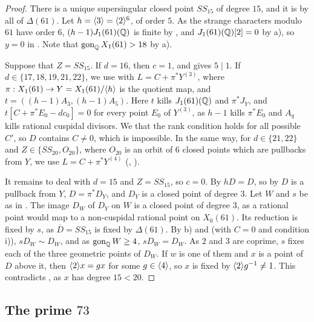 \begin{proof}
There is a unique supersingular closed point $SS_{15}$ of degree $15$, and it is  by all of $\Delta(61)$. Let $h=\langle 3\rangle=\langle 2\rangle^6$, of order $5$. As the strange characters modulo $61$ have order $6$, $(h-1)J_1(61)(\mathbb{Q})$ is finite by , and $J_1(61)(\mathbb{Q})[2]=0$ by  a), so $y=0$ in . Note that $\operatorname{gon}_{\mathbb{Q}} X_1(61)>18$ by  a).

Suppose that $Z=SS_{15}$. If $d=16$, then $c=1$, and  gives $5\mid 1$. If $d\in\{17,18,19,21,22\}$, we use  with $L=C+\pi^*Y^{(3)}$, where $\pi:X_1(61)\to Y=X_1(61)/\langle h\rangle$ is the quotient map, and $t=((h-1)A_3,(h-1)A_5)$. Here $t$ kills $J_1(61)(\mathbb{Q})$ and $\pi^*J_Y$, and $t[C+\pi^*E_0-dc_0]=0$ for every point $E_0$ of $Y^{(3)}$, as $h-1$ kills $\pi^*E_0$ and $A_q$ kills rational cuspidal divisors. We  that the rank condition holds for all possible $C'$, so $D$ contains $C\neq0$, which is impossible. In the same way, for $d\in\{21,22\}$ and $Z\in\{SS_{20},O_{20}\}$, where $O_{20}$ is an orbit of $6$ closed points which are pullbacks from $Y$, we use $L=C+\pi^*Y^{(4)}$ (, ).

It remains to deal with $d=15$ and $Z=SS_{15}$, so $c=0$. By  $hD=D$, so by  $D$ is a pullback from $Y$, $D=\pi^*D_Y$, and $D_Y$ is a closed point of degree $3$. Let $W$ and $s$ be as in . The image $D_W$ of $D_Y$ on $W$ is a closed point of degree $3$, as a rational point would map to a non-cuspidal rational point on $X_0(61)$. Its reduction is fixed by $s$, as $\overline D=SS_{15}$ is fixed by $\Delta(61)$. By  b) and  (with $C=0$ and condition i)), $sD_W\sim D_W$, and as $\operatorname{gon}_{\mathbb{Q}} W\geq 4$, $sD_W=D_W$. As $2$ and $3$ are coprime, $s$ fixes each of the three geometric points of $D_W$. If $w$ is one of them and $x$ is a point of $D$ above it, then $\langle 2\rangle x=gx$ for some $g\in\langle 4\rangle$, so $x$ is fixed by $\langle 2\rangle g^{-1}\neq1$. This contradicts , as $x$ has degree $15<20$.
\end{proof}

\subsection{The prime \texorpdfstring{$73$}{73}}


